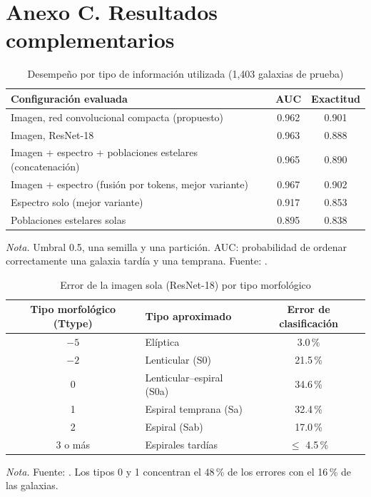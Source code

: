 \documentclass[letterpaper,11pt]{article}
\newcommand{\nota}[1]{{\footnotesize\textit{Nota.} #1\par}}
\begin{document}
\section*{Anexo C. Resultados complementarios}
\renewcommand{\thetable}{C\arabic{table}}\setcounter{table}{0}
\begin{table}[!ht]
\caption{Desempeño por tipo de información utilizada (1,403 galaxias de prueba)}
\small
\centering
\begin{tabular}{@{}lcc@{}}
\toprule
Configuración evaluada & AUC & Exactitud\\
\midrule
Imagen, red convolucional compacta (propuesto) & 0.962 & 0.901\\
Imagen, ResNet-18 & 0.963 & 0.888\\
Imagen + espectro + poblaciones estelares (concatenación) & 0.965 & 0.890\\
Imagen + espectro (fusión por tokens, mejor variante) & 0.967 & 0.902\\
Espectro solo (mejor variante) & 0.917 & 0.853\\
Poblaciones estelares solas & 0.895 & 0.838\\
\bottomrule
\end{tabular}
\nota{Umbral 0.5, una semilla y una partición. AUC: probabilidad de ordenar correctamente una galaxia tardía y una temprana. Fuente: \textcite{carreno2026}.}
\end{table}

\begin{table}[!ht]
\caption{Error de la imagen sola (ResNet-18) por tipo morfológico}
\small
\centering
\begin{tabular}{@{}clc@{}}
\toprule
Tipo morfológico (Ttype) & Tipo aproximado & Error de clasificación\\
\midrule
$-5$ & Elíptica & 3.0\,\%\\
$-2$ & Lenticular (S0) & 21.5\,\%\\
0 & Lenticular--espiral (S0a) & 34.6\,\%\\
1 & Espiral temprana (Sa) & 32.4\,\%\\
2 & Espiral (Sab) & 17.0\,\%\\
3 o más & Espirales tardías & $\leq$ 4.5\,\%\\
\bottomrule
\end{tabular}
\nota{Fuente: \textcite{carreno2026}. Los tipos 0 y 1 concentran el 48\,\% de los errores con el 16\,\% de las galaxias.}
\end{table}
\end{document}
